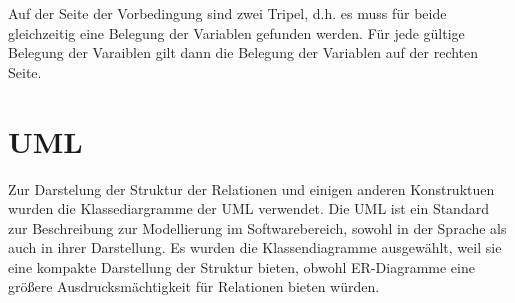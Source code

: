 Auf der Seite der Vorbedingung sind zwei Tripel, d.h. es muss für beide gleichzeitig eine Belegung der Variablen gefunden werden. Für jede gültige Belegung der Varaiblen gilt dann die Belegung der Variablen auf der rechten Seite.

\section{UML}
Zur Darstelung der Struktur der Relationen und einigen anderen Konstruktuen wurden die Klassediargramme der UML\cite{UML2} verwendet. Die UML ist ein Standard zur Beschreibung zur Modellierung im Softwarebereich, sowohl in der Sprache als auch in ihrer Darstellung. Es wurden die Klassendiagramme ausgewählt, weil sie eine kompakte Darstellung der Struktur bieten, obwohl ER-Diagramme eine größere Ausdrucksmächtigkeit für Relationen bieten würden. \cite{Martin2005}
